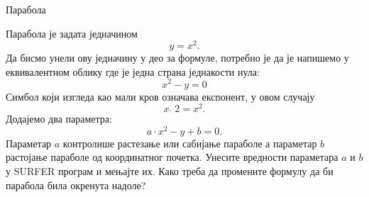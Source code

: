﻿\documentclass[en]{./../../common/SurferDesc}%
\begin{document}
\footnotesize
%
\begin{surferPage}
  \begin{surferTitle}Парабола\end{surferTitle}
   \begin{surferText}
   
Парабола је задата једначином  \[y=x^2.\]
Да бисмо унели ову једначину у део за формуле, потребно је да је напишемо у еквивалентном облику где је једна страна једнакости нула:
\[x^2-y=0\]
Симбол који изгледа као мали кров означава експонент, у овом случају  
\[ x  \,\hat{\ } \, 2 =x^2.\]
Додајемо два параметра:
\[a \cdot x^2-y+b=0.\]
Параметар $a$ контролише растезање или сабијање параболе а параметар  $b$ растојање параболе од координатног почетка.
\newline
Унесите вредности параметара  $a$ и $b$ у SURFER програм и мењајте их. Како треба да промените формулу да би парабола била окренута надоле?
\end{surferText}
\end{surferPage}
\end{document}

